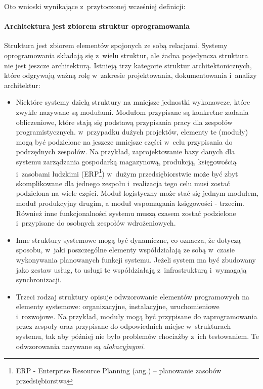 Oto wnioski wynikające z~przytoczonej wcześniej definicji:

\paragraph{Architektura jest zbiorem struktur oprogramowania\newline\newline}
Struktura jest zbiorem elementów spojonych ze sobą relacjami. Systemy oprogramowania składają się z~wielu struktur, ale żadna pojedyncza struktura nie jest jeszcze architekturą. Istnieją trzy kategorie struktur architektonicznych, które odgrywają ważną rolę w~zakresie projektowania, dokumentowania i~analizy architektur:
\begin{itemize}
\item
Niektóre systemy dzielą struktury na mniejsze jednostki wykonawcze, które zwykle nazywane są modułami. Modułom przypisane są konkretne zadania obliczeniowe, które stają się podstawą przypisania pracy dla zespołów programistycznych. w~przypadku dużych projektów, elementy te (moduły) mogą być podzielone na jeszcze mniejsze części w~celu przypisania do podrzędnych zespołów. Na przykład, zaprojektowanie bazy danych dla systemu zarządzania gospodarką magazynową, produkcją, księgowością i~zasobami ludzkimi (ERP\footnote{ERP - Enterprise Resource Planning (ang.) – planowanie zasobów przedsiębiorstwa}) w~dużym przedsiębiorstwie może być zbyt skomplikowane dla jednego zespołu i~realizacja tego celu musi zostać podzielona na wiele części. Moduł logistyczny może stać się jednym modułem, moduł produkcyjny drugim, a moduł wspomagania księgowości - trzecim. Również inne funkcjonalności systemu muszą czasem zostać podzielone i~przypisane do osobnych zespołów wdrożeniowych.
\item
Inne struktury systemowe mogą być dynamiczne, co oznacza, że dotyczą sposobu, w~jaki poszczególne elementy współdziałają ze sobą w~czasie wykonywania planowanych funkcji systemu. Jeżeli system ma być zbudowany jako zestaw usług, to usługi te współdziałają z~infrastrukturą i~wymagają synchronizacji. 

\item
Trzeci rodzaj struktury opisuje odwzorowanie elementów programowych na elementy systemowe: organizacyjne, instalacyjne, uruchomieniowe i~rozwojowe. Na przykład, moduły mogą być przypisane do zaprogramowania przez zespoły oraz przypisane do odpowiednich miejsc w~strukturach systemu, tak aby później nie było problemów chociażby z~ich testowaniem.
Te odwzorowania nazywane są \textit{alokacyjnymi}.

\end{itemize}

